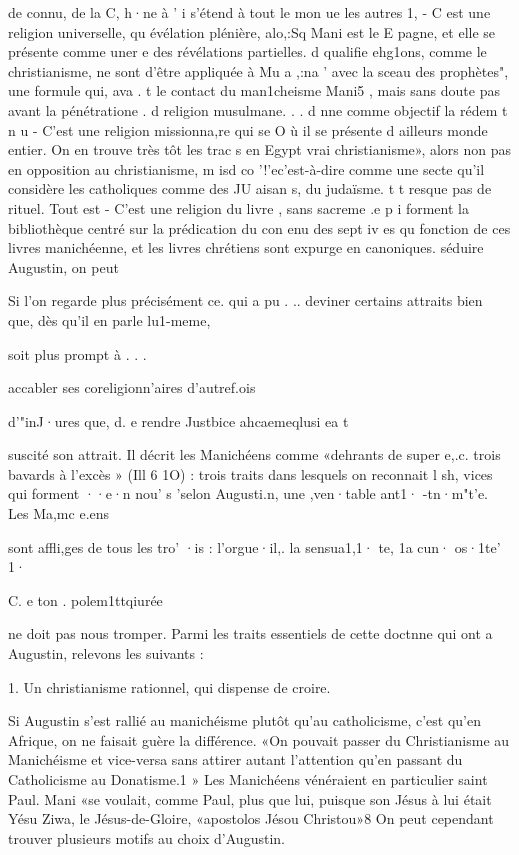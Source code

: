 de connu, de la C, h·ne à
'	i s'étend à tout le mon	ue les autres 1, - C est une religion universelle, qu  évélation plénière, alo,:Sq  Mani est le E pagne, et elle se présente comme uner e des révélations partielles. d  qualifie
ehg1ons, comme le christianisme, ne sont d'être appliquée à Mu a ,:na ' avec la sceau des prophètes", une formule qui, ava .	t	le contact du man1cheisme
Mani5 , mais sans doute pas avant la pénétratione	.	d
religion musulmane.	.	.	d	nne comme objectif la rédem t  n u
- C'est une religion missionna,re qui se  O	ù il se présente d ailleurs
monde entier. On en trouve très tôt les trac s en Egypt vrai christianisme», alors
non pas en opposition au christianisme, m isd  co '!'ec'est-à-dire comme une secte
qu'il considère les catholiques	comme des JU aisan s,
du judaïsme.	t	t	resque pas de rituel. Tout est
-	C'est une religion du  livre , sans sacreme .e  p	i	forment  la  bibliothèque
centré sur la prédication du con enu des sept iv es qu fonction	de ces livres manichéenne, et les livres chrétiens sont expurge	en
canoniques.
 	séduire	Augustin, on peut
 
Si l'on regarde plus précisément ce. qui a	pu .	.. deviner certains attraits bien que, dès qu'il en parle lu1-meme,
 
soit plus prompt à
.	.	 	.
 
accabler ses coreligionn'aires d'autref.ois
 
d'"inJ·ures que, d. e rendre Justbice ahcaemeqlusi ea t
 
suscité son attrait. Il décrit les Manichéens comme «dehrants de super e,.c.	trois
bavards à l'excès » (Ill 6 1O) : trois traits dans lesquels on reconnait	l sh,
vices qui forment ··e·n nou' s 'selon Augusti.n, une ,ven·table ant1· -tn·m"t'e. Les Ma,mc e.ens
 
sont affli,ges de tous les tro' ·is : l'orgue·il,. la sensua1,1· te, 1a cun· os·1te' 1·
 
C. e ton . polem1ttqiurée
 
ne doit pas nous tromper. Parmi les traits essentiels de cette doctnne qui ont a Augustin, relevons les suivants :

1.	Un  christianisme  rationnel,  qui  dispense  de croire.

Si Augustin s'est rallié au manichéisme plutôt qu'au catholicisme, c'est qu'en Afrique, on ne faisait guère la différence. «On pouvait passer du Christianisme au Manichéisme et vice-versa sans attirer autant l'attention qu'en passant du Catholicisme au Donatisme.1 » Les Manichéens vénéraient en particulier saint Paul. Mani «se voulait, comme Paul, plus que lui, puisque son Jésus à lui était Yésu Ziwa, le Jésus-de-Gloire, «apostolos Jésou Christou»8   On peut cependant trouver plusieurs motifs au choix d'Augustin.

